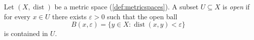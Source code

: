 
\begin{definition}
  \label{def:open-set}
  Let $(X, \operatorname{dist})$ be a metric space (\ref{def:metricspaces}).
  A subset $U \subseteq X$ is \emph{open} if for every $x \in U$ there
  exists $\varepsilon > 0$ such that the open ball
  $$ B(x,\varepsilon) = \{ y \in X : \operatorname{dist}(x,y) < \varepsilon \} $$
  is contained in $U$.
\end{definition}
